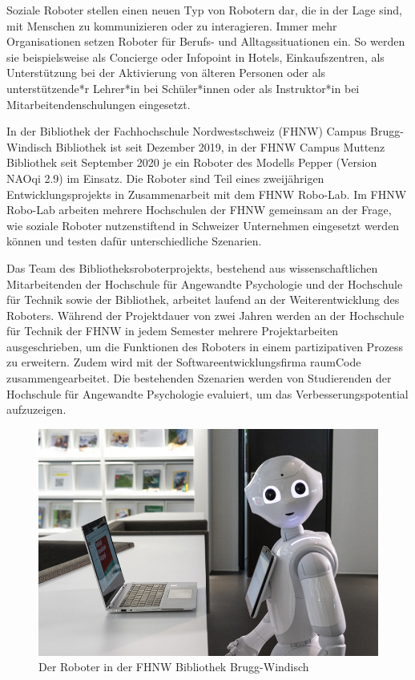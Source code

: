 \documentclass[a4paper,
fontsize=11pt,
oneside,
numbers=noperiodatend,
parskip=half-,
bibliography=totoc,
final
]{scrartcl}
\begin{document}
Soziale Roboter stellen einen neuen Typ von Robotern dar, die in der
Lage sind, mit Menschen zu kommunizieren oder zu interagieren. Immer
mehr Organisationen setzen Roboter für Berufs- und Alltagssituationen
ein. So werden sie beispielsweise als Concierge oder Infopoint in
Hotels, Einkaufszentren, als Unterstützung bei der Aktivierung von
älteren Personen oder als unterstützende*r Lehrer*in bei Schüler*innen
oder als Instruktor*in bei Mitarbeitendenschulungen eingesetzt.

In der Bibliothek der Fachhochschule Nordwestschweiz (FHNW) Campus
Brugg-Windisch Bibliothek ist seit Dezember 2019, in der FHNW Campus
Muttenz Bibliothek seit September 2020 je ein Roboter des Modells Pepper
(Version NAOqi 2.9) im Einsatz. Die Roboter sind Teil eines zweijährigen
Entwicklungsprojekts in Zusammenarbeit mit dem FHNW Robo-Lab. Im FHNW
Robo-Lab arbeiten mehrere Hochschulen der FHNW gemeinsam an der Frage,
wie soziale Roboter nutzenstiftend in Schweizer Unternehmen eingesetzt
werden können und testen dafür unterschiedliche Szenarien.

Das Team des Bibliotheksroboterprojekts, bestehend aus
wissenschaftlichen Mitarbeitenden der Hochschule für Angewandte
Psychologie und der Hochschule für Technik sowie der Bibliothek,
arbeitet laufend an der Weiterentwicklung des Roboters. Während der
Projektdauer von zwei Jahren werden an der Hochschule für Technik der
FHNW in jedem Semester mehrere Projektarbeiten ausgeschrieben, um die
Funktionen des Roboters in einem partizipativen Prozess zu erweitern.
Zudem wird mit der Softwareentwicklungsfirma raumCode
zusammengearbeitet. Die bestehenden Szenarien werden von Studierenden
der Hochschule für Angewandte Psychologie evaluiert, um das
Verbesserungspotential aufzuzeigen.

\begin{figure}
\centering
\includegraphics[width=.8\textwidth]{img/s_DSC8255.jpg}
\caption{Der Roboter in der FHNW Bibliothek Brugg-Windisch}
\end{figure}
\end{document}

